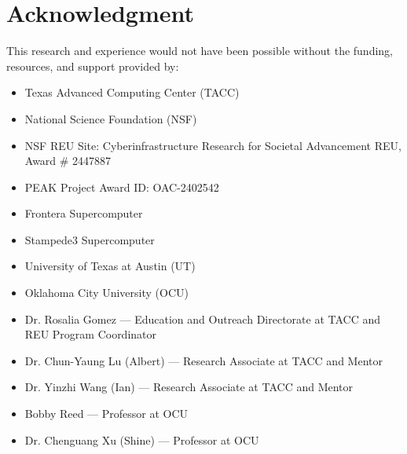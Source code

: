 \documentclass[conference]{IEEEtran}
\begin{document}
\section*{Acknowledgment}
This research and experience would not have been possible without the funding, resources, and support provided by:
\begin{itemize}
\item Texas Advanced Computing Center (TACC)
\item National Science Foundation (NSF)
\item NSF REU Site: Cyberinfrastructure Research for Societal Advancement REU, Award \# 2447887
\item PEAK Project Award ID: OAC-2402542
\item Frontera Supercomputer
\item Stampede3 Supercomputer
\item University of Texas at Austin (UT)
\item Oklahoma City University (OCU)
\item Dr. Rosalia Gomez --- Education and Outreach Directorate at TACC and REU Program Coordinator
\item Dr. Chun-Yaung Lu (Albert) --- Research Associate at TACC and Mentor
\item Dr. Yinzhi Wang (Ian) --- Research Associate at TACC and Mentor
\item Bobby Reed --- Professor at OCU
\item Dr. Chenguang Xu (Shine) --- Professor at OCU
\end{itemize}
\end{document}

